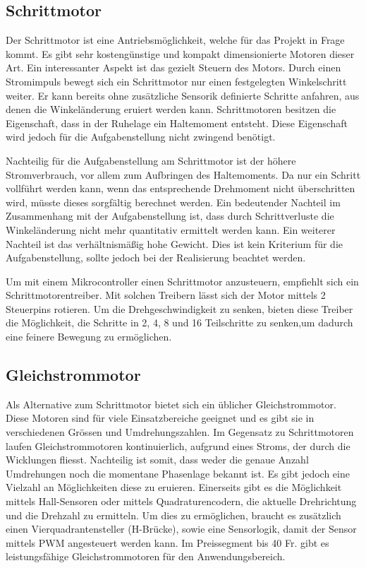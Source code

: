\subsection{Schrittmotor}
\label{subsec:Schrittmotor}
Der Schrittmotor ist eine Antriebsmöglichkeit, welche für das Projekt in Frage kommt. Es gibt sehr kostengünstige und kompakt dimensionierte Motoren dieser Art. Ein interessanter Aspekt ist das gezielt Steuern des Motors. Durch einen Stromimpuls bewegt sich ein Schrittmotor nur einen festgelegten Winkelschritt weiter. Er kann bereits ohne zusätzliche Sensorik definierte Schritte anfahren, aus denen die Winkeländerung eruiert werden kann. Schrittmotoren besitzen die Eigenschaft, dass in der Ruhelage ein Haltemoment entsteht. Diese Eigenschaft wird jedoch für die Aufgabenstellung nicht zwingend benötigt. 

Nachteilig für die Aufgabenstellung am Schrittmotor ist der höhere Stromverbrauch, vor allem zum Aufbringen des Haltemoments. Da nur ein Schritt vollführt werden kann, wenn das entsprechende Drehmoment nicht überschritten wird, müsste dieses sorgfältig berechnet werden. Ein bedeutender Nachteil im Zusammenhang mit der Aufgabenstellung ist, dass durch Schrittverluste die Winkeländerung nicht mehr quantitativ ermittelt werden kann.
Ein weiterer Nachteil ist das verhältnismäßig hohe Gewicht. Dies ist kein Kriterium für die Aufgabenstellung, sollte jedoch bei der Realisierung beachtet werden.

Um mit einem Mikrocontroller einen Schrittmotor anzusteuern, empfiehlt sich ein Schrittmotorentreiber. Mit solchen Treibern lässt sich der Motor mittels 2 Steuerpins rotieren. Um die Drehgeschwindigkeit zu senken, bieten diese Treiber die Möglichkeit, die Schritte in 2, 4, 8 und 16 Teilschritte zu senken,um dadurch eine feinere Bewegung zu ermöglichen. 

\subsection{Gleichstrommotor}
Als Alternative zum Schrittmotor bietet sich ein üblicher Gleichstrommotor. Diese Motoren sind für viele Einsatzbereiche geeignet und es gibt sie in verschiedenen Grössen und Umdrehungszahlen. Im Gegensatz zu Schrittmotoren laufen Gleichstrommotoren kontinuierlich, aufgrund eines Stroms, der durch die Wicklungen fliesst. Nachteilig ist somit, dass weder die genaue Anzahl Umdrehungen noch die momentane Phasenlage bekannt ist. Es gibt jedoch eine Vielzahl an Möglichkeiten diese zu eruieren. Einerseits gibt es die Möglichkeit mittels Hall-Sensoren oder mittels Quadraturencodern, die aktuelle Drehrichtung und die Drehzahl zu ermitteln. Um dies zu ermöglichen, braucht es zusätzlich einen Vierquadrantensteller (H-Brücke), sowie eine Sensorlogik, damit der Sensor mittels \ac{PWM} angesteuert werden kann. Im Preissegment bis 40 Fr. gibt es leistungsfähige Gleichstrommotoren für den Anwendungsbereich.

